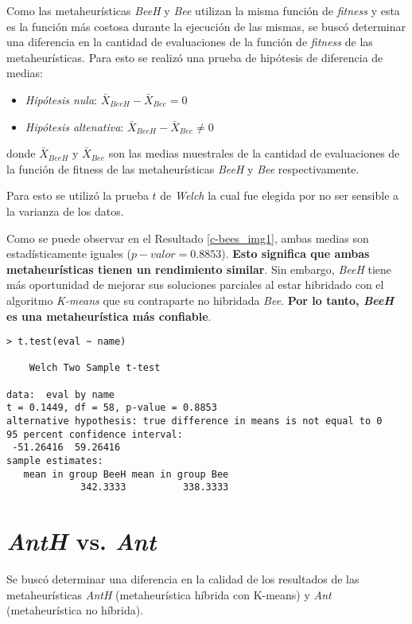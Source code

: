 	Como las metaheurísticas \emph{BeeH} y \emph{Bee} utilizan la misma función de
\emph{fitness} y esta es la función más costosa durante la ejecución de las mismas,
se buscó determinar una diferencia en la cantidad de evaluaciones de la función
de \emph{fitness} de las metaheurísticas. Para esto se realizó una prueba de
hipótesis de diferencia de medias:
\begin{itemize}
    \item \emph{Hipótesis nula}: $\bar{X}_{BeeH} - \bar{X}_{Bee} = 0$
    \item \emph{Hipótesis altenativa}: $\bar{X}_{BeeH} - \bar{X}_{Bee} \neq 0$
\end{itemize}
donde $\bar{X}_{BeeH}$ y $\bar{X}_{Bee}$ son las medias muestrales de la cantidad
de evaluaciones de la función de fitness de las metaheurísticas \emph{BeeH} y
\emph{Bee} respectivamente.

    Para esto se utilizó la prueba $t$ de \emph{Welch} \cite{AB_0} la cual fue
elegida por no ser sensible a la varianza de los datos.

	Como se puede observar en el Resultado \ref{c-bees_img1}, ambas medias son
estadísticamente iguales ($p-valor = 0.8853$). {\bf Esto significa que ambas
metaheurísticas tienen un rendimiento similar}. Sin embargo, \emph{BeeH} tiene
más oportunidad de mejorar sus soluciones parciales al estar hibridado con el
algoritmo \emph{K-means} que su contraparte no hibridada \emph{Bee}. {\bf Por lo
tanto, \emph{BeeH} es una metaheurística más confiable}.

\begin{lstlisting}[float=h!, caption={Diferencia de medias: Cantidad de Evaluaciones}, label=c-bees_img1]
> t.test(eval ~ name)

	Welch Two Sample t-test

data:  eval by name 
t = 0.1449, df = 58, p-value = 0.8853
alternative hypothesis: true difference in means is not equal to 0 
95 percent confidence interval:
 -51.26416  59.26416 
sample estimates:
   mean in group BeeH mean in group Bee 
             342.3333          338.3333 
\end{lstlisting}

\section{\emph{AntH} vs. \emph{Ant}}

	Se buscó determinar una diferencia en la calidad de los resultados de las
metaheurísticas \emph{AntH} (metaheurística híbrida con K-means) y
\emph{Ant} (metaheurística no híbrida).

